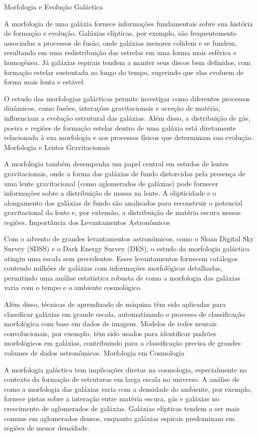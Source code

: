 Morfologia e Evolução Galáctica

A morfologia de uma galáxia fornece informações fundamentais sobre sua história de formação e evolução. Galáxias elípticas, por exemplo, são frequentemente associadas a processos de fusão, onde galáxias menores colidem e se fundem, resultando em uma redistribuição das estrelas em uma forma mais esférica e homogênea. Já galáxias espirais tendem a manter seus discos bem definidos, com formação estelar sustentada ao longo do tempo, sugerindo que elas evoluem de forma mais lenta e estável.

O estudo das morfologias galácticas permite investigar como diferentes processos dinâmicos, como fusões, interações gravitacionais e acreção de matéria, influenciam a evolução estrutural das galáxias. Além disso, a distribuição de gás, poeira e regiões de formação estelar dentro de uma galáxia está diretamente relacionada à sua morfologia e aos processos físicos que determinam sua evolução.
Morfologia e Lentes Gravitacionais

A morfologia também desempenha um papel central em estudos de lentes gravitacionais, onde a forma das galáxias de fundo distorcidas pela presença de uma lente gravitacional (como aglomerados de galáxias) pode fornecer informações sobre a distribuição de massa na lente. A elipticidade e o alongamento das galáxias de fundo são analisados para reconstruir o potencial gravitacional da lente e, por extensão, a distribuição de matéria escura nessas regiões.
Importância dos Levantamentos Astronômicos

Com o advento de grandes levantamentos astronômicos, como o Sloan Digital Sky Survey (SDSS) e o Dark Energy Survey (DES), o estudo da morfologia galáctica atingiu uma escala sem precedentes. Esses levantamentos fornecem catálogos contendo milhões de galáxias com informações morfológicas detalhadas, permitindo uma análise estatística robusta de como a morfologia das galáxias varia com o tempo e o ambiente cosmológico.

Além disso, técnicas de aprendizado de máquina têm sido aplicadas para classificar galáxias em grande escala, automatizando o processo de classificação morfológica com base em dados de imagens. Modelos de redes neurais convolucionais, por exemplo, têm sido usados para identificar padrões morfológicos em galáxias, contribuindo para a classificação precisa de grandes volumes de dados astronômicos.
Morfologia em Cosmologia

A morfologia galáctica tem implicações diretas na cosmologia, especialmente no contexto da formação de estruturas em larga escala no universo. A análise de como a morfologia das galáxias varia com a densidade do ambiente, por exemplo, fornece pistas sobre a interação entre matéria escura, gás e galáxias no crescimento de aglomerados de galáxias. Galáxias elípticas tendem a ser mais comuns em aglomerados densos, enquanto galáxias espirais predominam em regiões de menor densidade.

